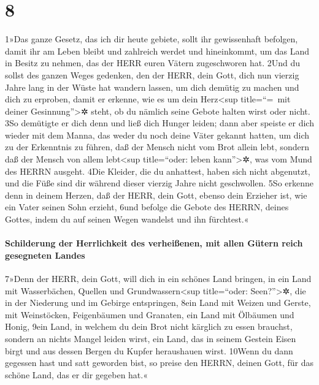 \hypertarget{section-7}{%
\section{8}\label{section-7}}

1»Das ganze Gesetz, das ich dir heute gebiete, sollt ihr gewissenhaft
befolgen, damit ihr am Leben bleibt und zahlreich werdet und
hineinkommt, um das Land in Besitz zu nehmen, das der HERR euren Vätern
zugeschworen hat. 2Und du sollst des ganzen Weges gedenken, den der
HERR, dein Gott, dich nun vierzig Jahre lang in der Wüste hat wandern
lassen, um dich demütig zu machen und dich zu erproben, damit er
erkenne, wie es um dein Herz\textless sup title=``=~mit deiner
Gesinnung''\textgreater✲ steht, ob du nämlich seine Gebote halten wirst
oder nicht. 3So demütigte er dich denn und ließ dich Hunger leiden; dann
aber speiste er dich wieder mit dem Manna, das weder du noch deine Väter
gekannt hatten, um dich zu der Erkenntnis zu führen, daß der Mensch
nicht vom Brot allein lebt, sondern daß der Mensch von allem
lebt\textless sup title=``oder: leben kann''\textgreater✲, was vom Mund
des HERRN ausgeht. 4Die Kleider, die du anhattest, haben sich nicht
abgenutzt, und die Füße sind dir während dieser vierzig Jahre nicht
geschwollen. 5So erkenne denn in deinem Herzen, daß der HERR, dein Gott,
ebenso dein Erzieher ist, wie ein Vater seinen Sohn erzieht, 6und
befolge die Gebote des HERRN, deines Gottes, indem du auf seinen Wegen
wandelst und ihn fürchtest.«

\hypertarget{schilderung-der-herrlichkeit-des-verheiuxdfenen-mit-allen-guxfctern-reich-gesegneten-landes}{%
\paragraph{Schilderung der Herrlichkeit des verheißenen, mit allen
Gütern reich gesegneten
Landes}\label{schilderung-der-herrlichkeit-des-verheiuxdfenen-mit-allen-guxfctern-reich-gesegneten-landes}}

7»Denn der HERR, dein Gott, will dich in ein schönes Land bringen, in
ein Land mit Wasserbächen, Quellen und Grundwassern\textless sup
title=``oder: Seen?''\textgreater✲, die in der Niederung und im Gebirge
entspringen, 8ein Land mit Weizen und Gerste, mit Weinstöcken,
Feigenbäumen und Granaten, ein Land mit Ölbäumen und Honig, 9ein Land,
in welchem du dein Brot nicht kärglich zu essen brauchst, sondern an
nichts Mangel leiden wirst, ein Land, das in seinem Gestein Eisen birgt
und aus dessen Bergen du Kupfer heraushauen wirst. 10Wenn du dann
gegessen hast und satt geworden bist, so preise den HERRN, deinen Gott,
für das schöne Land, das er dir gegeben hat.«

